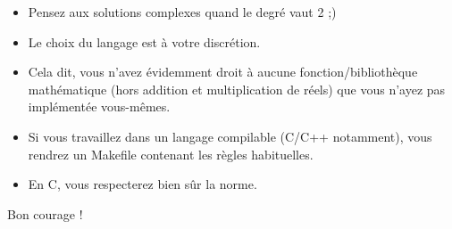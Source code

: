 \documentclass{42}
\begin{document}
	\begin{itemize}

		\item Pensez aux solutions complexes quand le degré vaut 2 ;)

		\item Le choix du langage est à votre discrétion.

		\item Cela dit, vous n'avez évidemment droit à aucune
          fonction/biblioth\`eque mathématique (hors addition et
          multiplication de réels) que vous n'ayez pas implémentée
          vous-mêmes.

		\item Si vous travaillez dans un langage compilable (C/C++
          notamment), vous rendrez un Makefile contenant les règles
          habituelles.

		\item En C, vous respecterez bien sûr la norme.\\

	\end{itemize}

    Bon courage !
\end{document}
